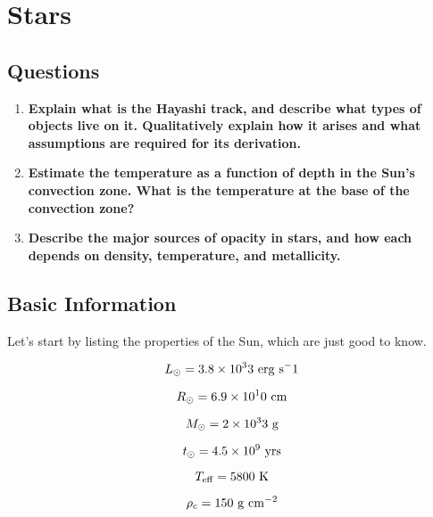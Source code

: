 \section{Stars}


\subsection{Questions}
\begin{enumerate}
\item \textbf{Explain what is the Hayashi track, and describe what types of objects live on it.
      Qualitatively explain how it arises and what assumptions are required for its derivation.}
\item \textbf{Estimate the temperature as a function of depth in the Sun's convection zone. What
      is the temperature at the base of the convection zone?}
\item \textbf{Describe the major sources of opacity in stars, and how each depends on density,
      temperature, and metallicity.}
\end{enumerate}


\subsection{Basic Information}

Let's start by listing the properties of the Sun, which are just good to know.

\begin{equation}
L_\odot = 3.8 \times 10^33~{\rm erg}~{\rm s}^-1
\end{equation}

\begin{equation}
R_\odot = 6.9 \times 10^10~{\rm cm}
\end{equation}

\begin{equation}
M_\odot = 2 \times 10^33~{\rm g}
\end{equation}

\begin{equation}
t_\odot = 4.5 \times 10^9~{\rm yrs}
\end{equation}

\begin{equation}
T_{\rm eff} = 5800~{\rm K}
\end{equation}

\begin{equation}
\rho_{\rm c} = 150~{\rm g}~{\rm cm}^{-2}
\end{equation}

